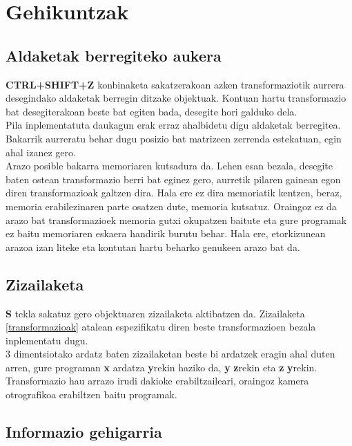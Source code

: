 \documentclass[12pt]{article}
\newcommand{\tekla}[1] {\textbf{#1}}
\begin{document}
\section{Gehikuntzak}

\subsection{Aldaketak berregiteko aukera}

\tekla{CTRL+SHIFT+Z} konbinaketa sakatzerakoan azken transformaziotik aurrera desegindako aldaketak berregin ditzake objektuak. Kontuan hartu transformazio bat desegiterakoan beste bat egiten bada, desegite hori galduko dela.\\
Pila inplementatuta daukagun erak erraz ahalbidetu digu aldaketak berregitea. Bakarrik aurreratu behar dugu posizio bat matrizeen zerrenda estekatuan, egin ahal izanez gero.\\

Arazo posible bakarra memoriaren kutsadura da. Lehen esan bezala, desegite baten ostean transformazio berri bat eginez gero, aurretik pilaren gainean egon diren transformazioak galtzen dira. Hala ere ez dira memoriatik kentzen, beraz, memoria erabilezinaren parte osatzen dute, memoria kutsatuz. Oraingoz ez da arazo bat transformazioek memoria gutxi okupatzen baitute eta gure programak ez baitu memoriaren eskaera handirik burutu behar. Hala ere, etorkizunean arazoa izan liteke eta kontutan hartu beharko genukeen arazo bat da.


\subsection{Zizailaketa}

\tekla{S} tekla sakatuz gero objektuaren zizailaketa aktibatzen da. Zizailaketa \ref{transformazioak} atalean espezifikatu diren beste transformazioen bezala inplementatu dugu.\\

3 dimentsiotako ardatz baten zizailaketan beste bi ardatzek eragin ahal duten arren, gure programan \textbf{x} ardatza \textbf{y}rekin haziko da, \textbf{y} \textbf{z}rekin eta \textbf{z} \textbf{y}rekin. Transformazio hau arrazo irudi dakioke erabiltzaileari, oraingoz kamera otrografikoa erabiltzen baitu programak.\\


\subsection{Informazio gehigarria}
\end{document}
